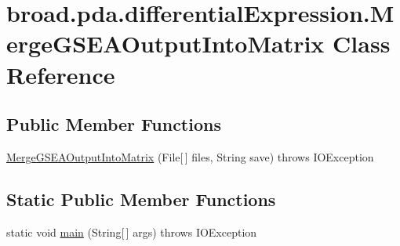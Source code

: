 \hypertarget{classbroad_1_1pda_1_1differential_expression_1_1_merge_g_s_e_a_output_into_matrix}{\section{broad.\+pda.\+differential\+Expression.\+Merge\+G\+S\+E\+A\+Output\+Into\+Matrix Class Reference}
\label{classbroad_1_1pda_1_1differential_expression_1_1_merge_g_s_e_a_output_into_matrix}
}
\subsection*{Public Member Functions}
\begin{DoxyCompactItemize}
\item 
\hyperlink{classbroad_1_1pda_1_1differential_expression_1_1_merge_g_s_e_a_output_into_matrix_a97967d31ddc20639ebe3476801dc866c}{Merge\+G\+S\+E\+A\+Output\+Into\+Matrix} (File\mbox{[}$\,$\mbox{]} files, String save)  throws I\+O\+Exception
\end{DoxyCompactItemize}
\subsection*{Static Public Member Functions}
\begin{DoxyCompactItemize}
\item 
static void \hyperlink{classbroad_1_1pda_1_1differential_expression_1_1_merge_g_s_e_a_output_into_matrix_a183077a2fed3eb1db3dd248cd8bea9b1}{main} (String\mbox{[}$\,$\mbox{]} args)  throws I\+O\+Exception
\end{DoxyCompactItemize}


